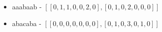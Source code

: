
\begin{itemize}[noitemsep]
  \item aaabaab - $[[0, 1, 1, 0, 0, 2, 0], [0, 1, 0, 2, 0, 0, 0]]$
  \item abacaba - $[[0, 0, 0, 0, 0, 0, 0], [0, 1, 0, 3, 0, 1, 0]]$
\end{itemize}